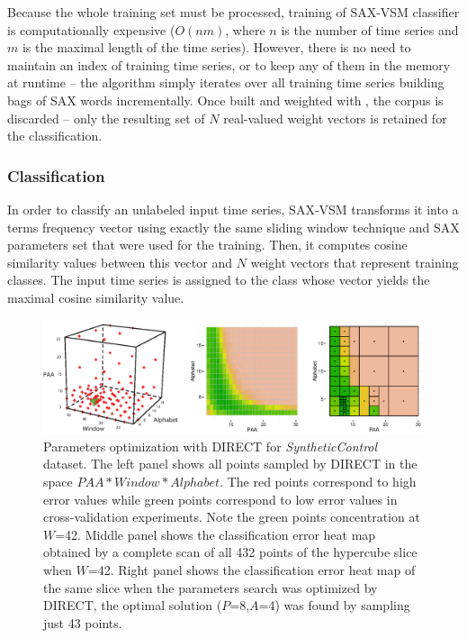 Because the whole training set must be processed, training of SAX-VSM classifier is computationally 
expensive ($O(nm)$, where $n$ is the number of time series and $m$ is the maximal length of the time series). 
However, there is no need to maintain an index of training time series, or to keep any 
of them in the memory at runtime -- the algorithm simply iterates over all training time series building 
bags of SAX words incrementally. Once built and weighted with \tfidf, the corpus is discarded -- only the
resulting set of $N$ real-valued weight vectors is retained for the classification.

\subsubsection{Classification}
In order to classify an unlabeled input time series, SAX-VSM transforms it into a terms frequency vector using 
exactly the same sliding window technique and SAX parameters set that were used for the training. 
Then, it computes cosine similarity values between this vector and $N$ \tfidf weight vectors that represent 
training classes. The input time series is assigned to the class whose vector yields the maximal cosine 
similarity value.

\begin{figure}[t]
   \centering
   \includegraphics[width=150mm]{figures/figure_direct.eps}
   \caption{Parameters optimization with DIRECT for \textit{SyntheticControl} dataset. 
   The left panel shows all points sampled by DIRECT in the space \mbox{$PAA*Window*Alphabet$}.
   The red points correspond to high error values while green points correspond to low error values 
   in cross-validation experiments. 
   Note the green points concentration at $W$=42. 
   Middle panel shows the classification error heat map obtained by a complete scan 
   of all 432 points of the hypercube slice when $W$=42. 
   Right panel shows the classification error heat map of the same slice when 
   the parameters search was optimized by DIRECT, 
   the optimal solution ($P$=8,$A$=4) was found by sampling just 43 points.}
   \label{fig:direct-sampling}
\end{figure}

